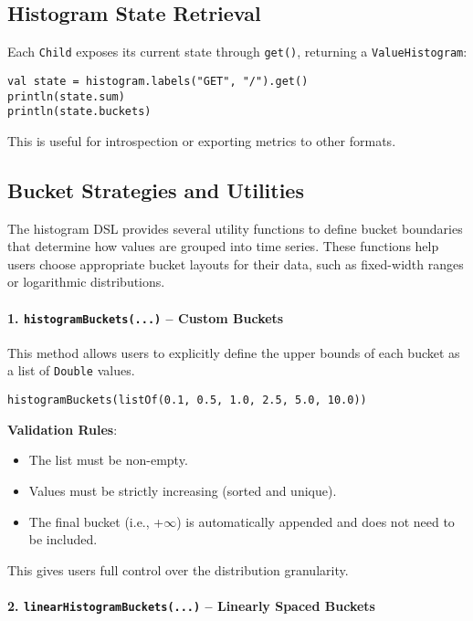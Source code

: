 \subsection{Histogram State Retrieval}

Each \texttt{Child} exposes its current state through \texttt{get()}, returning a \texttt{ValueHistogram}:

\begin{verbatim}
val state = histogram.labels("GET", "/").get()
println(state.sum)
println(state.buckets)
\end{verbatim}

This is useful for introspection or exporting metrics to other formats.

\subsection{Bucket Strategies and Utilities}

The histogram DSL provides several utility functions to define bucket boundaries that determine how values are grouped into time series. These functions help users choose appropriate bucket layouts for their data, such as fixed-width ranges or logarithmic distributions.

\paragraph{1. \texttt{histogramBuckets(...)} – Custom Buckets}

This method allows users to explicitly define the upper bounds of each bucket as a list of \texttt{Double} values.

\begin{verbatim}
histogramBuckets(listOf(0.1, 0.5, 1.0, 2.5, 5.0, 10.0))
\end{verbatim}

\textbf{Validation Rules}:
\begin{itemize}
    \item The list must be non-empty.
    \item Values must be strictly increasing (sorted and unique).
    \item The final bucket (i.e., +\(\infty\)) is automatically appended and does not need to be included.
\end{itemize}

This gives users full control over the distribution granularity.

\paragraph{2. \texttt{linearHistogramBuckets(...)} – Linearly Spaced Buckets}

